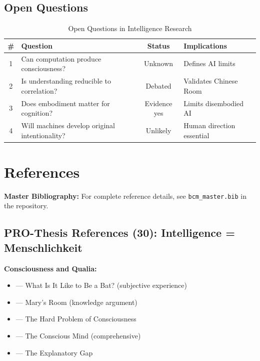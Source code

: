 \subsection{Open Questions}

\begin{table}[htbp]
\centering
\caption{Open Questions in Intelligence Research}
\renewcommand{\arraystretch}{1.3}
\begin{tabular}{@{}clcl@{}}
\toprule
\textbf{\#} & \textbf{Question} & \textbf{Status} & \textbf{Implications} \\
\midrule
1 & Can computation produce consciousness? & Unknown & Defines AI limits \\
2 & Is understanding reducible to correlation? & Debated & Validates Chinese Room \\
3 & Does embodiment matter for cognition? & Evidence yes & Limits disembodied AI \\
4 & Will machines develop original intentionality? & Unlikely & Human direction essential \\
\bottomrule
\end{tabular}
\end{table}


\section{References}
\label{sec:hi-references}

\begin{tcolorbox}[colback=blue!5!white, colframe=blue!75!black]
\textbf{Master Bibliography:} For complete reference details, see
\texttt{bcm\_master.bib} in the repository.
\end{tcolorbox}

\subsection{PRO-Thesis References (30): Intelligence = Menschlichkeit}

\textbf{Consciousness and Qualia:}
\begin{itemize}[nosep]
    \item \citet{nagel1974whatisit} --- What Is It Like to Be a Bat? (subjective experience)
    \item \citet{jackson1982epiphenomenal} --- Mary's Room (knowledge argument)
    \item \citet{chalmers1995facing} --- The Hard Problem of Consciousness
    \item \citet{chalmers1996conscious} --- The Conscious Mind (comprehensive)
    \item \citet{levine1983materialism} --- The Explanatory Gap
\end{itemize}

